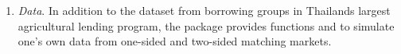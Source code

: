 \begin{enumerate}
\item \textit{Data}. In addition to the  dataset from borrowing groups in Thailands largest agricultural lending program, the package provides functions  and  to simulate one's own data from one-sided and two-sided matching markets. %
\end{enumerate}


